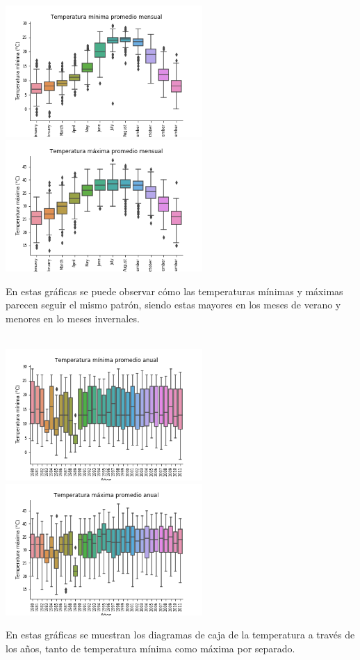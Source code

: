 \documentclass[letterpaper,12pt]{article}
\begin{document}
\\
\begin{center}
	\includegraphics[height=5cm]{cajamin_mensual.png} \hspace*{\fill}
    \includegraphics[height=5cm]{cajamax_mensual.png}
\end{center}
En estas gráficas se puede observar cómo las temperaturas mínimas y máximas parecen seguir el mismo patrón, siendo estas mayores en los meses de verano y menores en lo meses invernales.
\\ 
\\
\begin{center}
	\includegraphics[height=5cm]{cajamin_anual.png} \hspace*{\fill}
    \includegraphics[height=5cm]{cajamax_anual.png}
\end{center}
En estas gráficas se muestran los diagramas de caja de la temperatura a través de los años, tanto de temperatura mínima como máxima por separado. 
\end{document}
